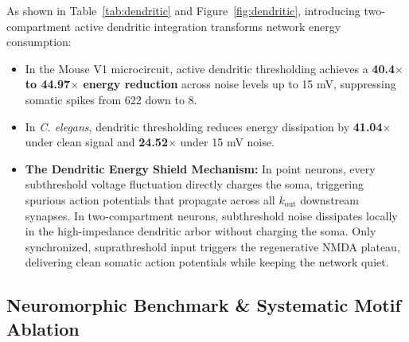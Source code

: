 \documentclass[10pt,twocolumn,letterpaper]{article}
\begin{document}
As shown in Table~\ref{tab:dendritic} and Figure~\ref{fig:dendritic}, introducing two-compartment active dendritic integration transforms network energy consumption:
\begin{itemize}[leftmargin=*]
    \item In the Mouse V1 microcircuit, active dendritic thresholding achieves a \textbf{40.4$\times$ to 44.97$\times$ energy reduction} across noise levels up to 15 mV, suppressing somatic spikes from 622 down to 8.
    \item In \textit{C. elegans}, dendritic thresholding reduces energy dissipation by \textbf{41.04$\times$} under clean signal and \textbf{24.52$\times$} under 15 mV noise.
    \item \textbf{The Dendritic Energy Shield Mechanism:} In point neurons, every subthreshold voltage fluctuation directly charges the soma, triggering spurious action potentials that propagate across all $k_{\mathrm{out}}$ downstream synapses. In two-compartment neurons, subthreshold noise dissipates locally in the high-impedance dendritic arbor without charging the soma. Only synchronized, suprathreshold input triggers the regenerative NMDA plateau, delivering clean somatic action potentials while keeping the network quiet.
\end{itemize}

\subsection{Neuromorphic Benchmark \& Systematic Motif Ablation}

\begin{table}[t]
\centering
\small
\caption{\textbf{Neuromorphic Architecture Comparative Benchmark Results on Temporal Pattern Discrimination.}}
\label{tab:benchmark}
\end{table}
\end{document}
